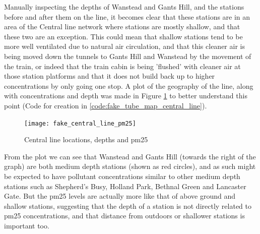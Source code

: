 Manually inspecting the depths of Wanstead and Gants Hill, and the stations before and after them on the line, it becomes clear that these stations are in an area of the Central line network where stations are mostly shallow, and that these two are an exception. This could mean that shallow stations tend to be more well ventilated due to natural air circulation, and that this cleaner air is being moved down the tunnels to Gants Hill and Wanstead by the movement of the train, or indeed that the train cabin is being 'flushed' with cleaner air at those station platforms and that it does not build back up to higher concentrations by only going one stop. A plot of the geography of the line, along with concentrations and depth was made in Figure \ref{fig:fake_central_line_pm25} to better understand this point (Code for creation in \ref{code:fake_tube_map_central_line}).

\begin{figure}[H]
\centering
\texttt{[image: fake\_central\_line\_pm25]}
\caption{Central line locations, depths and \gls{pm25}}
\label{fig:fake_central_line_pm25}
\end{figure}

From the plot we can see that Wanstead and Gants Hill (towards the right of the graph) are both medium depth stations (shown as red circles), and as such might be expected to have pollutant concentrations similar to other medium depth stations such as Shepherd's Busy, Holland Park, Bethnal Green and Lancaster Gate. But the \gls{pm25} levels are actually more like that of above ground and shallow stations, suggesting that the depth of a station is not directly related to \gls{pm25} concentrations, and that distance from outdoors or shallower stations is important too.

